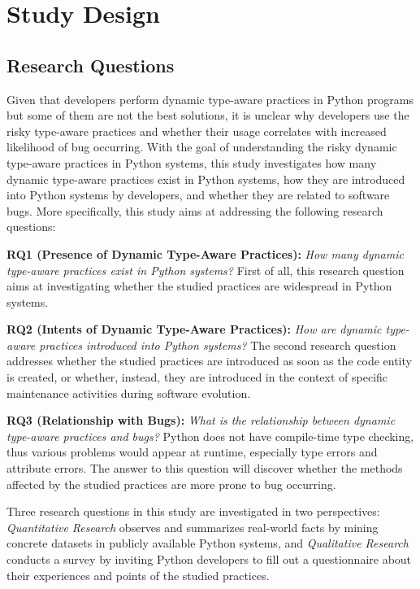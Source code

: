 
\section{Study Design}\label{sec:setup}

\subsection{Research Questions}

Given that developers perform dynamic type-aware practices in Python programs but some of them are not the best solutions, it is unclear why developers use the risky type-aware practices and whether their usage correlates with increased likelihood of bug occurring.
With the goal of understanding the risky dynamic type-aware practices in Python systems, this study investigates how many dynamic type-aware practices exist in Python systems, how they are introduced into Python systems by developers, and whether they are related to software bugs. More specifically, this study aims at addressing the following research questions:

\textbf{RQ1 (Presence of Dynamic Type-Aware Practices):} \emph{How many dynamic type-aware practices exist in Python systems?} First of all, this research question aims at investigating whether the studied practices are widespread in Python systems. 

\textbf{RQ2 (Intents of Dynamic Type-Aware Practices):} \emph{How are dynamic type-aware practices introduced into Python systems?} The second research question addresses whether the studied practices are introduced as soon as the code entity is created, or whether, instead, they are introduced in the context of specific maintenance activities during software evolution.

\textbf{RQ3 (Relationship with Bugs):} \emph{What is the relationship between dynamic type-aware practices and bugs?} Python does not have compile-time type checking, thus various problems would appear at runtime, especially type errors and attribute errors. The answer to this question will discover whether the methods affected by the studied practices are more prone to bug occurring.

Three research questions in this study are investigated in two perspectives: \emph{Quantitative Research} observes and summarizes real-world facts by mining concrete datasets in publicly available Python systems, and \emph{Qualitative Research} conducts a survey by inviting Python developers to fill out a questionnaire about their experiences and points of the studied practices.

